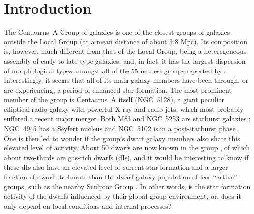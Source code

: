 \documentclass[preprint]{aastex}
\begin{document}

\section{Introduction}

The Centaurus~A Group of galaxies is one of the closest groups of
galaxies outside the Local Group (at a mean distance of about 3.8 Mpc).
Its composition is, however, much different from that of the Local Group, being
a heterogeneous assembly of early to late-type galaxies, and, in fact, it has
the largest dispersion of morphological types amongst all of the 55 nearest
groups reported by \citep{deV79}. Interestingly, it seems that all of its main
galaxy members have been through, or are experiencing, a period of enhanced 
star formation. The most prominent member of the group is Centaurus~A itself
(NGC~5128), a giant peculiar elliptical radio galaxy with powerful X-ray and
radio jets, which most probably suffered a recent major merger. Both M83 and
NGC~5253 are starburst galaxies \citep{cal99}; NGC~4945 has a Seyfert nucleus \citep{do96} 
and NGC~5102
is in a post-starburst phase \citep{da08}. One is then led to wonder if the group's dwarf
galaxy members also share this elevated level of activity. About 50 dwarfs
are now known in the group \citep{k07}, of which about two-thirds are gas-rich dwarfs
(dIs), and it would be interesting to know if these dIs also have an
elevated level of current star formation and a larger fraction of dwarf starbursts
than the dwarf galaxy population of less ``active'' groups, such as the nearby
Sculptor Group \citep{scm03a}. In other words, is the star formation activity
of the dwarfs influenced by their global group environment, or, does
it only depend on local conditions and internal processes?
\end{document}
